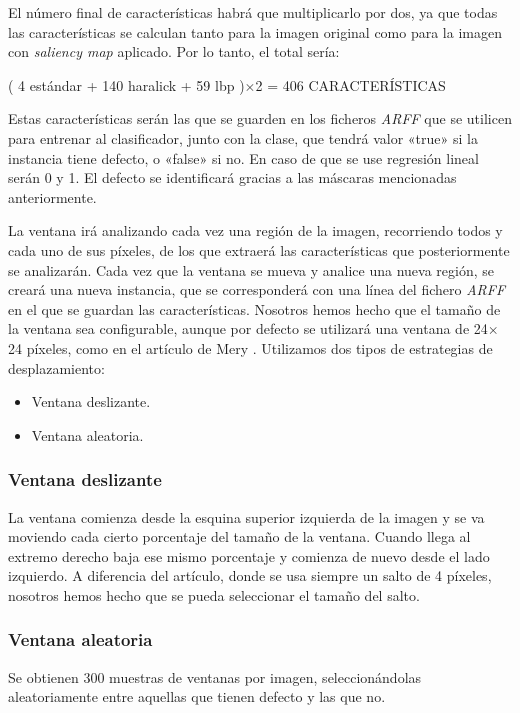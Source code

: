 El número final de características habrá que multiplicarlo por dos, ya que todas las características se calculan tanto para la imagen original como para la imagen con \emph{saliency map} aplicado. Por lo tanto, el total sería:

\begin{center}
( 4 estándar + 140 haralick + 59 lbp )$\times$2 = 406 CARACTERÍSTICAS
\end{center}

Estas características serán las que se guarden en los ficheros \textit{ARFF} que se utilicen para entrenar
al clasificador, junto con la clase, que tendrá valor «true» si la instancia tiene defecto, o «false» si
no. En caso de que se use regresión lineal serán 0 y 1. El defecto se identificará gracias a las máscaras mencionadas anteriormente.

La ventana irá analizando cada vez una región de la imagen, recorriendo todos y cada uno de sus píxeles, de los que extraerá las características que posteriormente se analizarán. Cada vez que la ventana se mueva y analice una nueva región, se creará una nueva instancia, que se corresponderá con una línea del fichero \textit{ARFF} en el que se guardan las características. Nosotros hemos hecho que el tamaño de la ventana sea configurable, aunque por defecto se utilizará una ventana de 24$\times$24 píxeles, como en el artículo de Mery \cite{DomingoMery}. Utilizamos dos tipos de estrategias de desplazamiento:

\begin{itemize}
\item Ventana deslizante.
\item Ventana aleatoria.
\end{itemize}

\subsubsection*{Ventana deslizante}
La ventana comienza desde la esquina superior izquierda de la imagen y se va moviendo cada cierto porcentaje del tamaño de la ventana. Cuando llega al extremo derecho baja ese mismo porcentaje y comienza de nuevo desde el lado izquierdo. A diferencia del artículo, donde se usa siempre un salto de 4 píxeles, nosotros hemos hecho que se pueda seleccionar el tamaño del salto.


\subsubsection*{Ventana aleatoria}
Se obtienen 300 muestras de ventanas por imagen, seleccionándolas aleatoriamente entre aquellas que tienen defecto y las que no.

